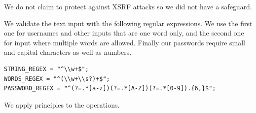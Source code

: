 \documentclass[a4paper]{article}
\begin{document}


We do not claim to protect against XSRF attacks so we did not have a safeguard.

We validate the text input with the following regular expressions. We use the first one for usernames and other inputs that are one word only, and the second one for input where multiple words are allowed. Finally our passwords require small and capital characters as well as numbers.
\begin{verbatim}
STRING_REGEX = "^\\w+$";
WORDS_REGEX = "^(\\w+\\s?)+$";
PASSWORD_REGEX = "^(?=.*[a-z])(?=.*[A-Z])(?=.*[0-9]).{6,}$";
\end{verbatim}


We apply principles\cite{princ} to the operations.
\end{document}
